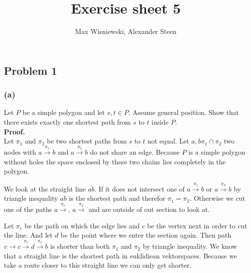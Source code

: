 \documentclass[11pt,a4paper,ngerman]{article}
\date{}
\title{Exercise sheet 5}
\author{Max Wisniewski, Alexander Steen}
\begin{document}

\renewcommand{\figurename}{Figure}

\maketitle
\thispagestyle{fancy}

\subsection*{Problem 1}

\subsubsection*{(a)}

Let $P$ be a simple polygon and let $s,t \in P$. Assume general position. Show that there exists exactly one shortest path
from $s$ to $t$ inside $P$.\\

\textbf{Proof.}\\

Let $\pi_1$ and $\pi_2$ be two shortest paths from $s$ to $t$ not equal. Let $a, b \pi_1 \cap \pi_2$ two nodes
with $a \overset{\pi_1}{\rightarrow} b$ and $a \overset{\pi_2}{\rightarrow} b$ do not share an edge.
Because $P$ is a simple polygon without holes the space enclosed by these two chains lies completely in the polygon.

We look at the straight line $\overline{ab}$. If it does not intersect one of $a \overset{\pi_1}{\rightarrow} b$ 
or $a \overset{\pi_2}{\rightarrow} b$ by triangle inequality
$\overline{ab}$ is the shortest path and therefor $\pi_1 = \pi_2$. 
Otherwise we cut one of the paths 
$a \overset{\pi_1}{\rightarrow}$, $a \overset{\pi_2}{\rightarrow}$ and are outside of out section to look at.

Let $\pi_c$ be the path on which the edge lies and $c$ be the vertex next in order to cut the line. 
And let $d$ be the point where we enter the section again.
Then path $v \rightarrow c \overset{\pi_c}{\rightarrow} d \overset{\pi_c}{\rightarrow} b$ is shorter than both $\pi_1$ and $\pi_2$
by triangle inequality. We know that a straight line is the shortest path in euklidiean vektorspaces.
Because we take a route closer to this straight line we can only get shorter.\\
\end{document}
